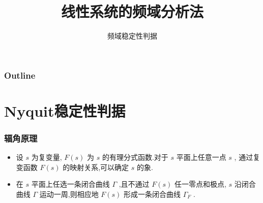 \documentclass[table]{beamer}
\subtitle{频域稳定性判据}
\title{线性系统的频域分析法}
\author{}
\date{}
\begin{document}
\maketitle

\begin{frame}
\frametitle{Outline}
\setcounter{tocdepth}{3}
\tableofcontents
\end{frame}













\section{Nyquit稳定性判据}
\label{sec-1}
\begin{frame}
\frametitle{辐角原理}
\label{sec-1-1}

\begin{itemize}
\item 设  $s$  为复变量,  $F(s)$  为  $s$  的有理分式函数.对于  $s$  平面上任意一点  $s$  , 通过复变函数  $F(s)$  的映射关系,可以确定  $s$  的象.
\item 在  $s$  平面上任选一条闭合曲线  $\Gamma$  ,且不通过  $F(s)$  任一零点和极点,  $s$  沿闭合曲线  $\Gamma$  运动一周,则相应地  $F(s)$  形成一条闭合曲线  $\Gamma_F$ .
\end{itemize}
\end{frame}
\end{document}
